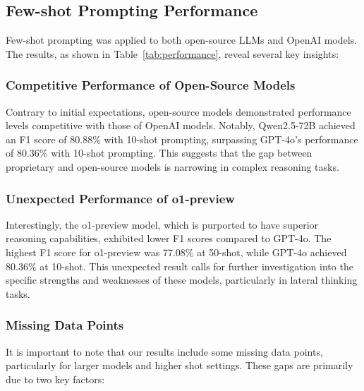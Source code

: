 \documentclass[conference]{IEEEtran}
\begin{document}
\subsection{Few-shot Prompting Performance}
Few-shot prompting was applied to both open-source LLMs and OpenAI models. The results, as shown in Table~\ref{tab:performance}, reveal several key insights:

\subsubsection{Competitive Performance of Open-Source Models}
Contrary to initial expectations, open-source models demonstrated performance levels competitive with those of OpenAI models. Notably, Qwen2.5-72B achieved an F1 score of 80.88\% with 10-shot prompting, surpassing GPT-4o's performance of 80.36\% with 10-shot prompting. This suggests that the gap between proprietary and open-source models is narrowing in complex reasoning tasks.

\subsubsection{Unexpected Performance of o1-preview}
Interestingly, the o1-preview model, which is purported to have superior reasoning capabilities, exhibited lower F1 scores compared to GPT-4o. The highest F1 score for o1-preview was 77.08\% at 50-shot, while GPT-4o achieved 80.36\% at 10-shot. This unexpected result calls for further investigation into the specific strengths and weaknesses of these models, particularly in lateral thinking tasks.


\subsubsection{Missing Data Points}
It is important to note that our results include some missing data points, particularly for larger models and higher shot settings. These gaps are primarily due to two key factors:
\end{document}
